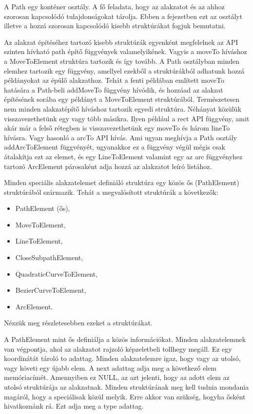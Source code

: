 \documentclass[12pt]{report}
\theoremstyle{definition}
\newcommand{\func}[1]{{\textsf{\footnotesize{#1}}}}
\begin{document}
A \func{Path} egy konténer osztály. A fő feladata, hogy az alakzatot és az
ahhoz szorosan kapcsolódó tulajdonságokat tárolja. Ebben a fejezetben ezt az
osztályt illetve a hozzá szorosan kapcsolódó kisebb struktúrákat fogjuk
bemutatni.

Az alakzat építéséhez tartozó kisebb struktúrák egyenként megfelelnek az API
szinten hívható path építő függvények valamelyikének. Vagyis a \func{moveTo}
híváshoz a \func{MoveToElement} struktúra tartozik és így tovább. A \func{Path}
osztályban minden elemhez tartozik egy függvény, amellyel ezekből a
struktúrákból adhatunk hozzá példányokat az épülő alakzathoz. Tehát a fenti
példában említett \func{moveTo} hatására a \func{Path}-beli \func{addMoveTo}
függvény hívódik, és hozzáad az alakzat építésének sorába egy példányt a
\func{MoveToElement} struktúrából. Természetesen nem minden alakzatépítő
híváshoz tartozik egyedi struktúra. Néhányat közülük visszavezethetünk egy vagy
több másikra. Ilyen például a \func{rect} API függvény, amit akár már a felső
rétegben is visszavezethetünk egy \func{moveTo} és három \func{lineTo} hívásra.
Vagy hasonló a \func{arcTo} API hívás. Ami ugyan meghívja a \func{Path} osztály
\func{addArcToElement} függvényét, ugyanakkor ez a függvény végül mégis csak
átalakítja ezt az elemet, és egy \func{LineToElement} valamint egy az
\func{arc} függvényhez tartozó \func{ArcElement} párosaként adja hozzá az
alakzatot leíró listához.

Minden speciális alakzatelemet definiáló struktúra egy közös ős
(\func{PathElement}) struktúrából származik. Tehát a megvalósított struktúrák a
következők:
  \begin{itemize}[noitemsep]
    \item \func{PathElement} (ős),
    \item \func{MoveToElement},
    \item \func{LineToElement},
    \item \func{CloseSubpathElement},
    \item \func{QuadraticCurveToElement},
    \item \func{BezierCurveToElement},
    \item \func{ArcElement}.
  \end{itemize}
Nézzük meg részletesebben ezeket a struktúrákat.

A \func{PathElement} mint ős definiálja a közös információkat. Minden
alakzatelemnek van végpontja, ahol az alakzatot rajzoló képzeletbeli tollhegy
megáll. Ez egy koordinátát tároló \func{to} adattag. Minden alakzatelemre igaz,
hogy vagy az utolsó, vagy követi egy újabb elem. A \func{next} adattag adja meg
a következő elem memóriacímét. Amennyiben ez \func{NULL}, az azt jelenti, hogy
az adott elem az utolsó struktúrája az alakzatnak. Minden struktúrának meg kell
tudnia mondania magáról, hogy a speciálisak közül melyik. Erre akkor van
szükség, hogyha ősként hivatkoznánk rá. Ezt adja meg a \func{type} adattag.
\end{document}

